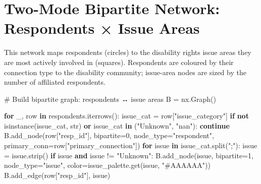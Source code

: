 \documentclass[
  letterpaper,
  DIV=11,
  numbers=noendperiod]{scrartcl}
\newenvironment{Shaded}{\begin{snugshade}}{\end{snugshade}}
\newcommand{\BuiltInTok}[1]{\textcolor[rgb]{0.00,0.23,0.31}{#1}}
\newcommand{\CommentTok}[1]{\textcolor[rgb]{0.37,0.37,0.37}{#1}}
\newcommand{\ControlFlowTok}[1]{\textcolor[rgb]{0.00,0.23,0.31}{\textbf{#1}}}
\newcommand{\DecValTok}[1]{\textcolor[rgb]{0.68,0.00,0.00}{#1}}
\newcommand{\KeywordTok}[1]{\textcolor[rgb]{0.00,0.23,0.31}{\textbf{#1}}}
\newcommand{\NormalTok}[1]{\textcolor[rgb]{0.00,0.23,0.31}{#1}}
\newcommand{\OperatorTok}[1]{\textcolor[rgb]{0.37,0.37,0.37}{#1}}
\newcommand{\StringTok}[1]{\textcolor[rgb]{0.13,0.47,0.30}{#1}}
\begin{document}
\section{Two-Mode Bipartite Network: Respondents × Issue
Areas}\label{two-mode-bipartite-network-respondents-issue-areas}

This network maps respondents (circles) to the disability rights issue
areas they are most actively involved in (squares). Respondents are
coloured by their connection type to the disability community;
issue-area nodes are sized by the number of affiliated respondents.

\label{bipartite-build}
\begin{Shaded}
\begin{Highlighting}[]
\CommentTok{\# Build bipartite graph: respondents ↔ issue areas}
\NormalTok{B }\OperatorTok{=}\NormalTok{ nx.Graph()}

\ControlFlowTok{for}\NormalTok{ \_, row }\KeywordTok{in}\NormalTok{ respondents.iterrows():}
\NormalTok{    issue\_cat }\OperatorTok{=}\NormalTok{ row[}\StringTok{"issue\_category"}\NormalTok{]}
    \ControlFlowTok{if} \KeywordTok{not} \BuiltInTok{isinstance}\NormalTok{(issue\_cat, }\BuiltInTok{str}\NormalTok{) }\KeywordTok{or}\NormalTok{ issue\_cat }\KeywordTok{in}\NormalTok{ (}\StringTok{"Unknown"}\NormalTok{, }\StringTok{"nan"}\NormalTok{):}
        \ControlFlowTok{continue}
\NormalTok{    B.add\_node(row[}\StringTok{"resp\_id"}\NormalTok{], bipartite}\OperatorTok{=}\DecValTok{0}\NormalTok{, node\_type}\OperatorTok{=}\StringTok{"respondent"}\NormalTok{,}
\NormalTok{               primary\_conn}\OperatorTok{=}\NormalTok{row[}\StringTok{"primary\_connection"}\NormalTok{])}
    \ControlFlowTok{for}\NormalTok{ issue }\KeywordTok{in}\NormalTok{ issue\_cat.split(}\StringTok{";"}\NormalTok{):}
\NormalTok{        issue }\OperatorTok{=}\NormalTok{ issue.strip()}
        \ControlFlowTok{if}\NormalTok{ issue }\KeywordTok{and}\NormalTok{ issue }\OperatorTok{!=} \StringTok{"Unknown"}\NormalTok{:}
\NormalTok{            B.add\_node(issue, bipartite}\OperatorTok{=}\DecValTok{1}\NormalTok{, node\_type}\OperatorTok{=}\StringTok{"issue"}\NormalTok{,}
\NormalTok{                       color}\OperatorTok{=}\NormalTok{issue\_palette.get(issue, }\StringTok{"\#AAAAAA"}\NormalTok{))}
\NormalTok{            B.add\_edge(row[}\StringTok{"resp\_id"}\NormalTok{], issue)}


\end{Highlighting}
\end{Shaded}
\end{document}
